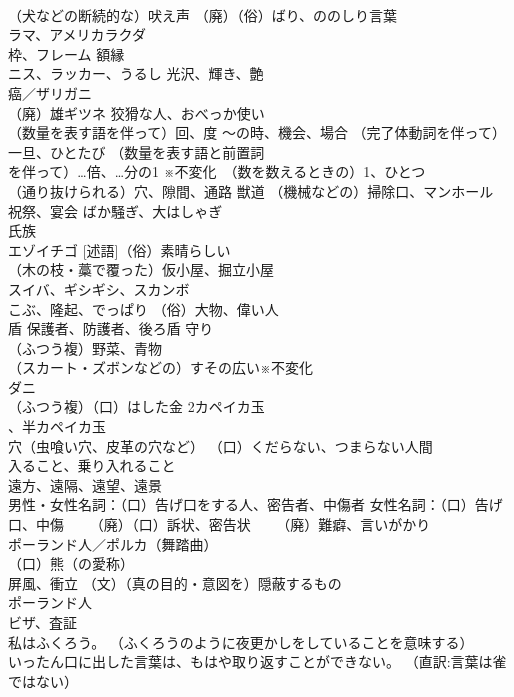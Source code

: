 \documentclass[8pt]{extreport}
\begin{document}
\begin{CJK}{UTF8}{min}
\\	（犬などの断続的な）吠え声 （廃）（俗）ばり、ののしり言葉
\\	ラマ、アメリカラクダ
\\	枠、フレーム 額縁
\\	ニス、ラッカー、うるし 光沢、輝き、艶
\\	癌／ザリガニ
\\	（廃）雄ギツネ 狡猾な人、おべっか使い
\\	（数量を表す語を伴って）回、度 ～の時、機会、場合 （完了体動詞を伴って）一旦、ひとたび （数量を表す語と前置詞
\\	を伴って）…倍、…分の1 ※不変化　（数を数えるときの）1、ひとつ
\\	（通り抜けられる）穴、隙間、通路 獣道 （機械などの）掃除口、マンホール
\\	祝祭、宴会 ばか騒ぎ、大はしゃぎ
\\	氏族
\\	エゾイチゴ [述語]（俗）素晴らしい
\\	（木の枝・藁で覆った）仮小屋、掘立小屋
\\	スイバ、ギシギシ、スカンボ
\\	こぶ、隆起、でっぱり （俗）大物、偉い人
\\	盾 保護者、防護者、後ろ盾 守り
\\	（ふつう複）野菜、青物
\\	（スカート・ズボンなどの）すその広い※不変化
\\	ダニ
\\	（ふつう複）（口）はした金 2カペイカ玉
\\	、半カペイカ玉
\\	穴（虫喰い穴、皮革の穴など） （口）くだらない、つまらない人間
\\	入ること、乗り入れること
\\	遠方、遠隔、遠望、遠景
\\	男性・女性名詞：（口）告げ口をする人、密告者、中傷者 女性名詞：（口）告げ口、中傷 　　（廃）（口）訴状、密告状 　　（廃）難癖、言いがかり
\\	ポーランド人／ポルカ（舞踏曲）
\\	（口）熊（の愛称）
\\	屏風、衝立 （文）（真の目的・意図を）隠蔽するもの
\\	ポーランド人
\\	ビザ、査証
\\	私はふくろう。 （ふくろうのように夜更かしをしていることを意味する）
\\	いったん口に出した言葉は、もはや取り返すことができない。 （直訳:言葉は雀ではない）

\end{CJK}
\end{document}

